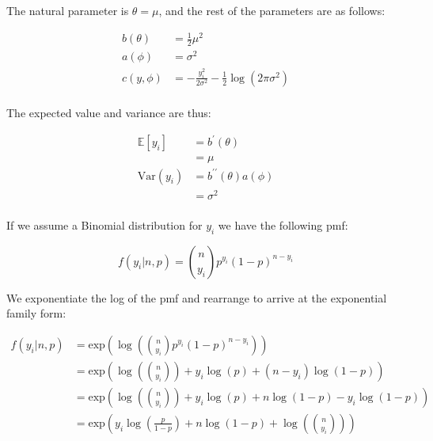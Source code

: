 \documentclass{report}
\begin{document}
The natural parameter is $\theta = \mu$, and the rest of the parameters are as follows:

\begin{equation}\label{eq:ex-glm-normal-dist-params}
    \begin{aligned}
        b(\theta) &= \frac{1}{2}\mu^2 \\
        a(\phi) &= \sigma^2 \\
        c(y, \phi) &= - \frac{y_i^2}{2\sigma^2} - \frac{1}{2}\log(2\pi\sigma^2) \\
    \end{aligned}
\end{equation}

The expected value and variance are thus:

\begin{equation}\label{eq:ex-glm-normal-dist-mean-var}
    \begin{aligned}
        \mathbb{E}[y_i]
          &= b^\prime(\theta) \\
          &= \mu \\
        \text{Var}(y_i)
          &= b^{\prime\prime}(\theta)a(\phi) \\
          &= \sigma^2 \\
    \end{aligned}
\end{equation}

If we assume a Binomial distribution for $y_i$ we have the following \gls{pmf}:

\begin{equation}\label{eq:ex-glm-binomial-dist}
    f(y_i|n, p) = \binom{n}{y_i}p^{y_i} (1-p)^{n-y_i}
\end{equation}

We exponentiate the log of the \gls{pmf} and rearrange to arrive at the exponential family form:

\begin{equation}\label{eq:ex-glm-binomial-dist-exp-form}
    \begin{aligned}
        f(y_i|n, p) 
          &= \text{exp}\left(\log\left(\binom{n}{y_i}p^{y_i} (1-p)^{n-y_i}\right)\right) \\
          &= \text{exp}\left(\log\left(\binom{n}{y_i}\right) + y_i\log(p) + (n-y_i)\log(1-p)\right) \\
          &= \text{exp}\left(\log\left(\binom{n}{y_i}\right) + y_i\log(p) + n\log(1-p) - y_i\log(1-p)\right) \\
          &= \text{exp}\left(y_i\log\left(\frac{p}{1-p}\right) + n\log(1-p) + \log\left(\binom{n}{y_i}\right)\right) \\
    \end{aligned}
\end{equation}
\end{document}
